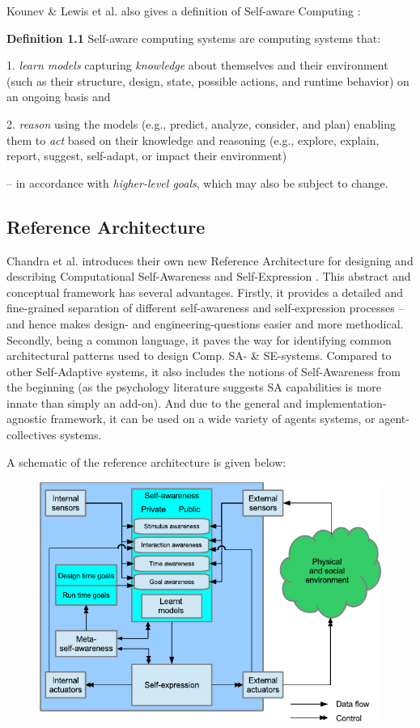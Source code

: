 	Kounev \& Lewis et al. also gives a definition of Self-aware Computing \cite{sacs17_ch1}:

	\textbf{Definition 1.1} Self-aware computing systems are computing systems that:

	1. \textit{learn models} capturing \textit{knowledge} about themselves and their environment (such as their structure, design, state, possible actions, and runtime behavior) on an ongoing basis and

	2. \textit{reason} using the models (e.g., predict, analyze, consider, and plan) enabling them to \textit{act} based on their knowledge and reasoning (e.g., explore, explain, report, suggest, self-adapt, or impact their environment)

	-- in accordance with \textit{higher-level goals}, which may also be subject to change.


	\subsection{Reference Architecture}

	Chandra et al. introduces their own new Reference Architecture for designing and describing Computational Self-Awareness and Self-Expression \cite{sacs16_ch4}. This abstract and conceptual framework has several advantages. Firstly, it provides a detailed and fine-grained separation of different self-awareness and self-expression processes -- and hence makes design- and engineering-questions easier and more methodical. Secondly, being a common language, it paves the way for identifying common architectural patterns used to design Comp. SA- \& SE-systems. Compared to other Self-Adaptive systems, it also includes the notions of Self-Awareness from the beginning (as the psychology literature suggests SA capabilities is more innate than simply an add-on). And due to the general and implementation-agnostic framework, it can be used on a wide variety of agents systems, or agent-collectives systems.

	A schematic of the reference architecture is given below:

	\begin{figure}[!htp]
	\centering
	\includegraphics[width=0.9\columnwidth]{Assets/DocSegments/Chapters/Background/Figures/Schema/SA_and_SE_architecture.pdf}
	\end{figure}

